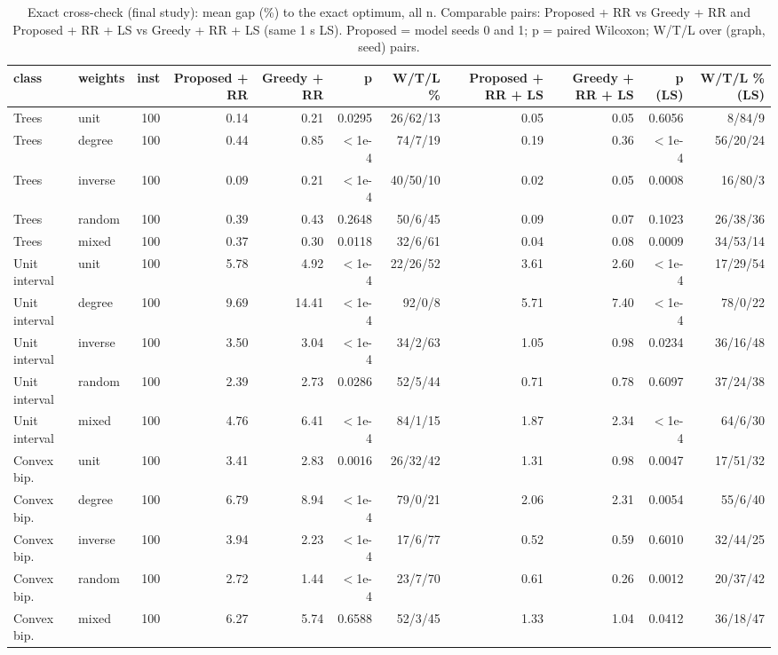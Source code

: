 \begin{table}[t]
\centering
\caption{Exact cross-check (final study): mean gap (\%) to the exact optimum, all n. Comparable pairs: Proposed + RR vs Greedy + RR and Proposed + RR + LS vs Greedy + RR + LS (same 1 s LS). Proposed = model seeds 0 and 1; p = paired Wilcoxon; W/T/L over (graph, seed) pairs.}
\label{tab:exact_fair_final}
\scriptsize
\begin{tabular}{llrrrrrrrrr}
\toprule
class & weights & inst & Proposed + RR & Greedy + RR & p & W/T/L \% & Proposed + RR + LS & Greedy + RR + LS & p (LS) & W/T/L \% (LS) \\
\midrule
Trees & unit & 100 & 0.14 & 0.21 & 0.0295 & 26/62/13 & 0.05 & 0.05 & 0.6056 & 8/84/9 \\
Trees & degree & 100 & 0.44 & 0.85 & $<$1e-4 & 74/7/19 & 0.19 & 0.36 & $<$1e-4 & 56/20/24 \\
Trees & inverse & 100 & 0.09 & 0.21 & $<$1e-4 & 40/50/10 & 0.02 & 0.05 & 0.0008 & 16/80/3 \\
Trees & random & 100 & 0.39 & 0.43 & 0.2648 & 50/6/45 & 0.09 & 0.07 & 0.1023 & 26/38/36 \\
Trees & mixed & 100 & 0.37 & 0.30 & 0.0118 & 32/6/61 & 0.04 & 0.08 & 0.0009 & 34/53/14 \\
Unit interval & unit & 100 & 5.78 & 4.92 & $<$1e-4 & 22/26/52 & 3.61 & 2.60 & $<$1e-4 & 17/29/54 \\
Unit interval & degree & 100 & 9.69 & 14.41 & $<$1e-4 & 92/0/8 & 5.71 & 7.40 & $<$1e-4 & 78/0/22 \\
Unit interval & inverse & 100 & 3.50 & 3.04 & $<$1e-4 & 34/2/63 & 1.05 & 0.98 & 0.0234 & 36/16/48 \\
Unit interval & random & 100 & 2.39 & 2.73 & 0.0286 & 52/5/44 & 0.71 & 0.78 & 0.6097 & 37/24/38 \\
Unit interval & mixed & 100 & 4.76 & 6.41 & $<$1e-4 & 84/1/15 & 1.87 & 2.34 & $<$1e-4 & 64/6/30 \\
Convex bip. & unit & 100 & 3.41 & 2.83 & 0.0016 & 26/32/42 & 1.31 & 0.98 & 0.0047 & 17/51/32 \\
Convex bip. & degree & 100 & 6.79 & 8.94 & $<$1e-4 & 79/0/21 & 2.06 & 2.31 & 0.0054 & 55/6/40 \\
Convex bip. & inverse & 100 & 3.94 & 2.23 & $<$1e-4 & 17/6/77 & 0.52 & 0.59 & 0.6010 & 32/44/25 \\
Convex bip. & random & 100 & 2.72 & 1.44 & $<$1e-4 & 23/7/70 & 0.61 & 0.26 & 0.0012 & 20/37/42 \\
Convex bip. & mixed & 100 & 6.27 & 5.74 & 0.6588 & 52/3/45 & 1.33 & 1.04 & 0.0412 & 36/18/47 \\

\end{tabular}
\end{table}

